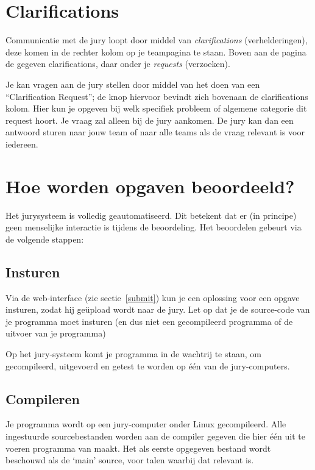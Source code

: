 \section{Clarifications}

Communicatie met de jury loopt door middel van \emph{clarifications}
(verhelderingen), deze komen in de rechter kolom op je teampagina te
staan. Boven aan de pagina de gegeven clarifications, daar onder je
\emph{requests} (verzoeken).

Je kan vragen aan de jury stellen door middel van het doen van een
``Clarification Request''; de knop hiervoor bevindt zich bovenaan de
clarifications kolom. Hier kun je opgeven bij welk specifiek probleem
of algemene categorie dit request hoort. Je vraag zal alleen bij de
jury aankomen. De jury kan dan een antwoord sturen naar jouw team of
naar alle teams als de vraag relevant is voor iedereen.

\section{Hoe worden opgaven beoordeeld?}\label{howjudged}

Het \DOMjudge jurysysteem is volledig geautomatiseerd. Dit betekent
dat er (in principe) geen menselijke interactie is tijdens de
beoordeling. Het beoordelen gebeurt via de volgende stappen:

\subsection{Insturen}

Via%
de web-interface (zie sectie~\ref{submit}) kun je een oplossing voor
een opgave insturen, zodat hij ge\"upload wordt naar de jury. Let op
dat je de source-code van je programma moet insturen (en dus niet een
gecompileerd programma of de uitvoer van je programma)

Op het jury-systeem komt je programma in de wachtrij te staan, om gecompileerd,
uitgevoerd en getest te worden op \'e\'en van de jury-computers.

\subsection{Compileren}

Je programma wordt op een jury-computer onder Linux gecompileerd.
Alle ingestuurde sourcebestanden worden aan de compiler gegeven die
hier \'e\'en uit te voeren programma van maakt. Het als eerste
opgegeven bestand wordt beschouwd als de `main' source, voor talen
waarbij dat relevant is.

